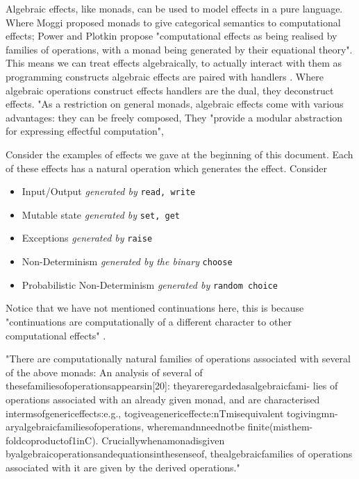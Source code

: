 Algebraic effects, like monads, can be used to model effects in a pure language.
Where Moggi \cite{moggi1989computational} proposed monads to give categorical semantics to computational effects;
Power and Plotkin \cite{Plotkin:2002dw} propose "computational effects as being realised by
families of operations, with a monad being generated by their equational theory".
This means we can treat effects algebraically,
to actually interact with them as programming constructs algebraic effects are paired with
handlers \cite{plotkin2009handlers}.
Where algebraic operations construct effects handlers are the dual, they deconstruct effects.
"As a restriction on general monads, algebraic effects come with various advantages:
they can be freely composed,
\cite{leijen2017type}
They "provide a modular abstraction for expressing effectful computation"\cite{dolan2015effective},

\begin{example}
    Consider the examples of effects we gave at the beginning of this document.
    Each of these effects has a natural operation which generates the effect.
    Consider
    \begin{itemize}
        \item Input/Output \textit{generated by} \texttt{read, write}
        \item Mutable state \textit{generated by} \texttt{set, get}
        \item Exceptions \textit{generated by} \texttt{raise}
        \item Non-Determinism \textit{generated by the binary} \texttt{choose}
        \item Probabilistic Non-Determinism \textit{generated by} \texttt{random choice}
    \end{itemize}
\end{example}

Notice that we have not mentioned continuations here,
this is because
"continuations are computationally of a different character to other computational effects"
\cite{Plotkin:2002dw}.

"There are computationally natural families of operations associated with several of the above monads:
An analysis of several of thesefamiliesofoperationsappearsin[20]:
theyareregardedasalgebraicfami- lies of operations associated with an already given monad,
and are characterised intermsofgenericeffects:e.g.,
togiveagenericeffecte:nTmisequivalent togivingmn-aryalgebraicfamiliesofoperations,
wheremandnneednotbe finite(misthem-foldcoproductof1inC).
Cruciallywhenamonadisgiven byalgebraicoperationsandequationsinthesenseof,
thealgebraicfamilies of operations associated with it are given by the derived operations."
\cite{Plotkin:2002dw}

